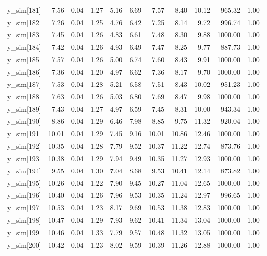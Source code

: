 \begin{table}[ht]
\begin{tabular}{rrrrrrrrrrr}
  y\_sim[181] & 7.56 & 0.04 & 1.27 & 5.16 & 6.69 & 7.57 & 8.40 & 10.12 & 965.32 & 1.00 \\ 
  y\_sim[182] & 7.26 & 0.04 & 1.25 & 4.76 & 6.42 & 7.25 & 8.14 & 9.72 & 996.74 & 1.00 \\ 
  y\_sim[183] & 7.45 & 0.04 & 1.26 & 4.83 & 6.61 & 7.48 & 8.30 & 9.88 & 1000.00 & 1.00 \\ 
  y\_sim[184] & 7.42 & 0.04 & 1.26 & 4.93 & 6.49 & 7.47 & 8.25 & 9.77 & 887.73 & 1.00 \\ 
  y\_sim[185] & 7.57 & 0.04 & 1.26 & 5.00 & 6.74 & 7.60 & 8.43 & 9.91 & 1000.00 & 1.00 \\ 
  y\_sim[186] & 7.36 & 0.04 & 1.20 & 4.97 & 6.62 & 7.36 & 8.17 & 9.70 & 1000.00 & 1.00 \\ 
  y\_sim[187] & 7.53 & 0.04 & 1.28 & 5.21 & 6.58 & 7.51 & 8.43 & 10.02 & 951.23 & 1.00 \\ 
  y\_sim[188] & 7.63 & 0.04 & 1.26 & 5.03 & 6.80 & 7.69 & 8.47 & 9.98 & 1000.00 & 1.00 \\ 
  y\_sim[189] & 7.43 & 0.04 & 1.27 & 4.97 & 6.59 & 7.45 & 8.31 & 10.00 & 943.34 & 1.00 \\ 
  y\_sim[190] & 8.86 & 0.04 & 1.29 & 6.46 & 7.98 & 8.85 & 9.75 & 11.32 & 920.04 & 1.00 \\ 
  y\_sim[191] & 10.01 & 0.04 & 1.29 & 7.45 & 9.16 & 10.01 & 10.86 & 12.46 & 1000.00 & 1.00 \\ 
  y\_sim[192] & 10.35 & 0.04 & 1.28 & 7.79 & 9.52 & 10.37 & 11.22 & 12.74 & 873.76 & 1.00 \\ 
  y\_sim[193] & 10.38 & 0.04 & 1.29 & 7.94 & 9.49 & 10.35 & 11.27 & 12.93 & 1000.00 & 1.00 \\ 
  y\_sim[194] & 9.55 & 0.04 & 1.30 & 7.04 & 8.68 & 9.53 & 10.41 & 12.14 & 873.82 & 1.00 \\ 
  y\_sim[195] & 10.26 & 0.04 & 1.22 & 7.90 & 9.45 & 10.27 & 11.04 & 12.65 & 1000.00 & 1.00 \\ 
  y\_sim[196] & 10.40 & 0.04 & 1.26 & 7.96 & 9.53 & 10.35 & 11.24 & 12.97 & 996.65 & 1.00 \\ 
  y\_sim[197] & 10.53 & 0.04 & 1.23 & 8.17 & 9.69 & 10.53 & 11.38 & 12.83 & 1000.00 & 1.00 \\ 
  y\_sim[198] & 10.47 & 0.04 & 1.29 & 7.93 & 9.62 & 10.41 & 11.34 & 13.04 & 1000.00 & 1.00 \\ 
  y\_sim[199] & 10.46 & 0.04 & 1.33 & 7.79 & 9.57 & 10.48 & 11.32 & 13.05 & 1000.00 & 1.00 \\ 
  y\_sim[200] & 10.42 & 0.04 & 1.23 & 8.02 & 9.59 & 10.39 & 11.26 & 12.88 & 1000.00 & 1.00 \\ 

\end{tabular}
\end{table}
